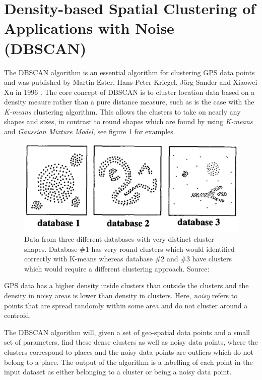 \section{Density-based Spatial Clustering of Applications with Noise (DBSCAN)}
The DBSCAN algorithm is an essential algorithm for clustering GPS data points and was published by Martin Ester, Hans-Peter Kriegel, Jörg Sander and Xiaowei Xu in 1996 \cite{density-based-1996}. The core concept of DBSCAN is to cluster location data based on a density meaure rather than a pure distance measure, such as is the case with the \textit{K-means} clustering algorithm. This allows the clusters to take on nearly any shapes and sizes, in contrast to round shapes which are found by using \textit{K-means} and \textit{Gaussian Mixture Model}, see figure \ref{fig:dbscan_shapes} for examples.

\begin{figure}
    \centering
    \includegraphics[width=\textwidth]{images/dbscan-clusters.png}
    \caption{Data from three different databases with very distinct cluster shapes. Database \#1 has very round clusters which would identified correctly with K-means whereas database \#2 and \#3 have clusters which would require a different clustering approach. Source: \cite{density-based-1996}}
    \label{fig:dbscan_shapes}
\end{figure}

GPS data has a higher density inside clusters than outside the clusters and the density in noisy areas is lower than density in clusters. Here, \textit{noisy} refers to points that are spread randomly within some area and do not cluster around a centroid.

The DBSCAN algorithm will, given a set of geo-spatial data points and a small set of parameters, find these dense clusters as well as noisy data points, where the clusters correspond to places and the noisy data points are outliers which do not belong to a place. The output of the algorithm is a labelling of each point in the input dataset as either belonging to a cluster or being a noisy data point.

